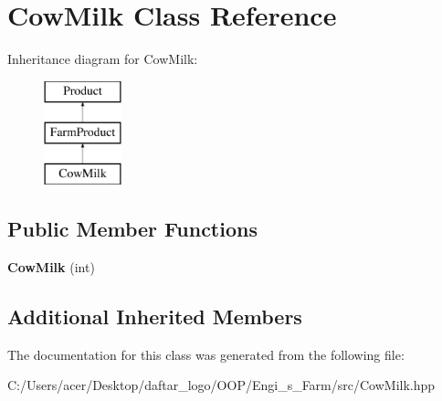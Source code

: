 \hypertarget{class_cow_milk}{}\section{Cow\+Milk Class Reference}
\label{class_cow_milk}
Inheritance diagram for Cow\+Milk\+:\begin{figure}[H]
\begin{center}
\leavevmode
\includegraphics[height=3.000000cm]{class_cow_milk}
\end{center}
\end{figure}
\subsection*{Public Member Functions}
\begin{DoxyCompactItemize}
\item 
\mbox{\label{class_cow_milk_a2d6418e29a7a0371f10352fa5e125b38}} 
{\bfseries Cow\+Milk} (int)
\end{DoxyCompactItemize}
\subsection*{Additional Inherited Members}


The documentation for this class was generated from the following file\+:\begin{DoxyCompactItemize}
\item 
C\+:/\+Users/acer/\+Desktop/daftar\+\_\+logo/\+O\+O\+P/\+Engi\+\_\+s\+\_\+\+Farm/src/Cow\+Milk.\+hpp\end{DoxyCompactItemize}
